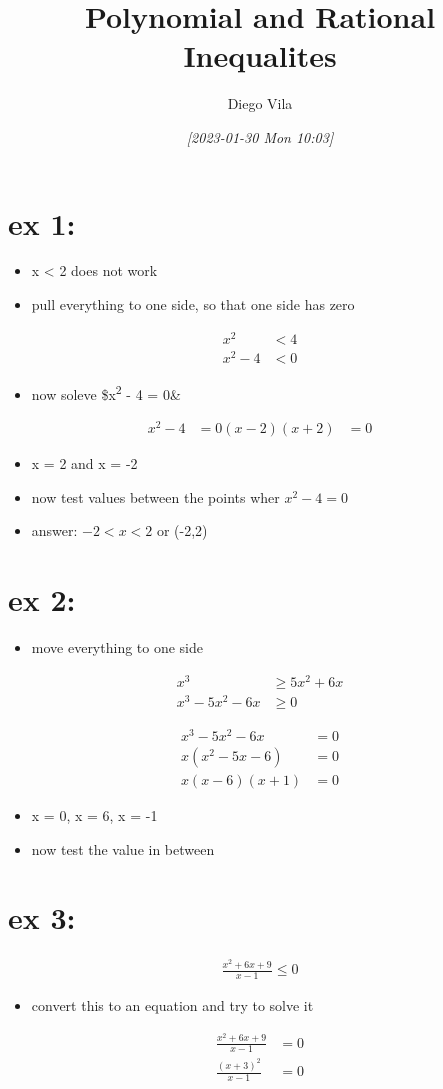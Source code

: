 \documentclass[11pt]{article}
\author{Diego Vila}
\date{\textit{[2023-01-30 Mon 10:03]}}
\title{Polynomial and Rational Inequalites}
\begin{document}
\maketitle
\tableofcontents


\section{ex 1:}
\label{sec:org5cefca1}
\begin{itemize}
\item x < 2 does not work
\item pull everything to one side, so that one side has zero
\end{itemize}
\begin{align*}
x^2 &< 4\\
x^2 - 4 &< 0
\end{align*}
\begin{itemize}
\item now soleve \$x\textsuperscript{2} - 4 = 0\&
\end{itemize}
\begin{align*}
x^2 - 4 &= 0
(x - 2)(x + 2) &= 0 
\end{align*}
\begin{itemize}
\item x = 2 and x = -2
\item now test values between the points wher \(x^2 - 4 = 0\)
\item answer: \(-2 < x < 2\) or (-2,2)
\end{itemize}

\section{ex 2:}
\label{sec:orga277275}
\begin{itemize}
\item move everything to one side
\end{itemize}
\begin{align*}
x^3 &\geq 5x^2 + 6x\\
x^3 -5x^2 - 6x &\geq 0
\end{align*}

\begin{align*}
x^3 - 5x^2 - 6x &= 0\\
x(x^2 - 5x - 6) &= 0\\
x(x - 6)(x + 1 ) &= 0
\end{align*}
\begin{itemize}
\item x = 0, x = 6, x = -1

\item now test the value in between
\end{itemize}

\section{ex 3:}
\label{sec:org7df41d2}
\begin{align*}
\frac{x^2 + 6x + 9}{x - 1} \leq 0
\end{align*}
\begin{itemize}
\item convert this to an equation and try to solve it
\end{itemize}
\begin{align*}
\frac{x^2 + 6x + 9}{x - 1} &= 0\\
\frac{(x + 3)^2}{x - 1} &= 0
\end{align*}
\end{document}
